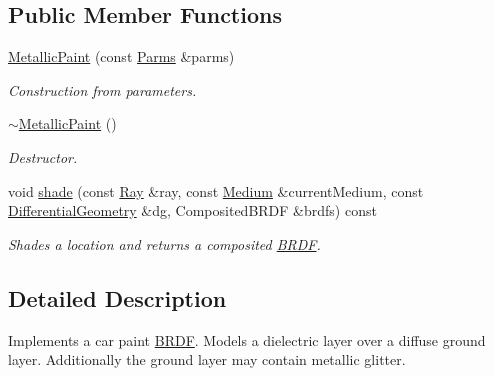 \subsection*{Public Member Functions}
\begin{DoxyCompactItemize}
\item 
\hyperlink{classembree_1_1_metallic_paint_a6d24af1cb7708e23597bef4241128c33}{MetallicPaint} (const \hyperlink{classembree_1_1_parms}{Parms} \&parms)
\begin{DoxyCompactList}\small\item\em Construction from parameters. \item\end{DoxyCompactList}\item 
\hypertarget{classembree_1_1_metallic_paint_ad1efa08386c07a67804c2effd70e73a4}{
\hyperlink{classembree_1_1_metallic_paint_ad1efa08386c07a67804c2effd70e73a4}{$\sim$MetallicPaint} ()}
\label{classembree_1_1_metallic_paint_ad1efa08386c07a67804c2effd70e73a4}

\begin{DoxyCompactList}\small\item\em Destructor. \item\end{DoxyCompactList}\item 
\hypertarget{classembree_1_1_metallic_paint_a348f5ecba9ce8dd81cd83175905a10af}{
void \hyperlink{classembree_1_1_metallic_paint_a348f5ecba9ce8dd81cd83175905a10af}{shade} (const \hyperlink{structembree_1_1_ray}{Ray} \&ray, const \hyperlink{classembree_1_1_medium}{Medium} \&currentMedium, const \hyperlink{structembree_1_1_differential_geometry}{DifferentialGeometry} \&dg, CompositedBRDF \&brdfs) const }
\label{classembree_1_1_metallic_paint_a348f5ecba9ce8dd81cd83175905a10af}

\begin{DoxyCompactList}\small\item\em Shades a location and returns a composited \hyperlink{classembree_1_1_b_r_d_f}{BRDF}. \item\end{DoxyCompactList}\end{DoxyCompactItemize}


\subsection{Detailed Description}
Implements a car paint \hyperlink{classembree_1_1_b_r_d_f}{BRDF}. Models a dielectric layer over a diffuse ground layer. Additionally the ground layer may contain metallic glitter. 

